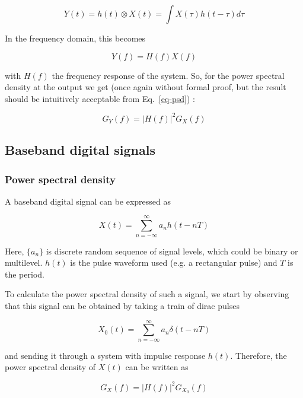 \begin{equation}
Y(t) = h(t) \otimes X(t) = \int X(\tau) h(t-\tau) d \tau
\end{equation} 

In the frequency domain, this becomes

\begin{equation}
Y(f) = H(f) X(f)
\end{equation} 

with $H(f)$ the frequency response of the system. So, for the power spectral density at the output we get (once again without formal proof, but the result should be intuitively acceptable from Eq.~\ref{eq-psd}) :

\begin{equation}
G_Y(f) = \left | H(f) \right | ^ 2 G_X(f)
\end{equation}
 
\subsection{Baseband digital signals}

\subsubsection{Power spectral density}

A baseband digital signal can be expressed as

\begin{equation}
X(t) = \sum_{n=-\infty}^{\infty}a_n h(t-nT)
\end{equation} 

Here, $\{ a_n \}$ is discrete random sequence of signal levels, which could be binary or multilevel. $h(t)$ is the pulse waveform used (e.g. a rectangular pulse) and $T$ is the period.

To calculate the power spectral density of such a signal, we start by observing that this signal can be obtained by taking a train of dirac pulses

\begin{equation}
X_0(t) = \sum_{n=-\infty}^{\infty}a_n \delta(t-nT)
\end{equation} 

and sending it through a system with impulse response $h(t)$. Therefore, the power spectral density of $X(t)$ can be written as

\begin{equation}
G_X(f) = \left | H(f) \right |^2 G_{X_0}(f)
\end{equation} 


